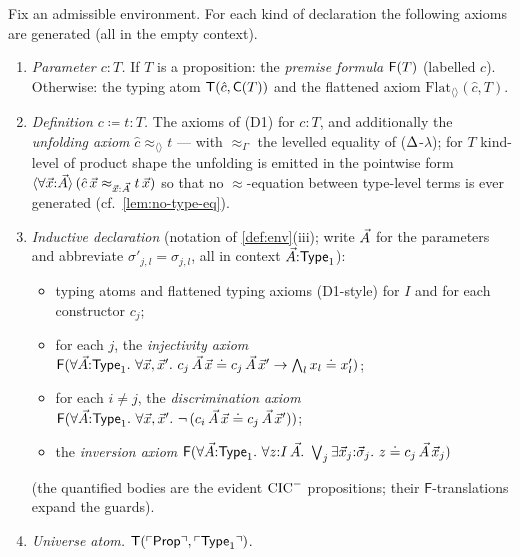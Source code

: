 \begin{definition}
\label{def:transl-problem}
Fix an admissible environment.  For each kind of declaration the
following axioms are generated (all in the empty context).
\begin{enumerate}[label=(D\arabic*),leftmargin=3em]
\item \emph{Parameter $c : T$.}  If $T$ is a proposition: the
  \emph{premise formula} $\mathsf{F}(T)$ (labelled $c$).  Otherwise: the
  typing atom $\mathsf{T}(\hat{c}, \mathsf{C}(T))$ and the flattened axiom
  $\mathrm{Flat}_{\langle\rangle}(\hat{c}, T)$.
\item \emph{Definition $c \coloneqq t : T$.}  The axioms of (D1) for
  $c : T$, and additionally the \emph{unfolding axiom}
  $\hat{c} \approx_{\langle\rangle} t$ --- with $\approx_{\Gamma}$
  the levelled equality of ($\Delta$-$\lambda$); for $T$ kind-level of
  product shape the unfolding is emitted in the pointwise form
  $\langle\forall \vec{x}{:}\vec{A}\rangle\, (\hat{c}\,\vec{x}
  \approx_{\vec{x}:\vec{A}} t\,\vec{x})$ so that no
  $\approx$-equation between type-level terms is ever generated
  (cf.\ \cref{lem:no-type-eq}).
\item \emph{Inductive declaration} (notation of \cref{def:env}(iii);
  write $\vec{A}$ for the parameters and abbreviate $\sigma'_{j,l} =
  \sigma_{j,l}$, all in context $\vec{A}{:}\mathsf{Type}_1$):
  \begin{itemize}
  \item typing atoms and flattened typing axioms (D1-style) for $I$
    and for each constructor $c_j$;
  \item for each $j$, the \emph{injectivity axiom}
    $\mathsf{F}(\forall \vec{A}{:}\mathsf{Type}_1.\ \forall \vec{x}, \vec{x}'.\
      c_j\,\vec{A}\,\vec{x} \doteq c_j\,\vec{A}\,\vec{x}' \to
      \bigwedge_l x_l \doteq x'_l)$;
  \item for each $i \neq j$, the \emph{discrimination axiom}
    $\mathsf{F}(\forall \vec{A}{:}\mathsf{Type}_1.\ \forall \vec{x}, \vec{x}'.\
      \neg\,( c_i\,\vec{A}\,\vec{x} \doteq c_j\,\vec{A}\,\vec{x}' ))$;
  \item the \emph{inversion axiom}
    $\mathsf{F}(\forall \vec{A}{:}\mathsf{Type}_1.\ \forall z{:}I\,\vec{A}.\
      \bigvee_j \exists \vec{x}_j{:}\vec{\sigma}_j.\
      z \doteq c_j\,\vec{A}\,\vec{x}_j)$
  \end{itemize}
  (the quantified bodies are the evident $\mathrm{CIC}^{-}$ propositions; their
  $\mathsf{F}$-translations expand the guards).
\item \emph{Universe atom.} $\mathsf{T}(\ulcorner \mathsf{Prop} \urcorner, \ulcorner \mathsf{Type}_1 \urcorner)$.

\end{enumerate}
\end{definition}
